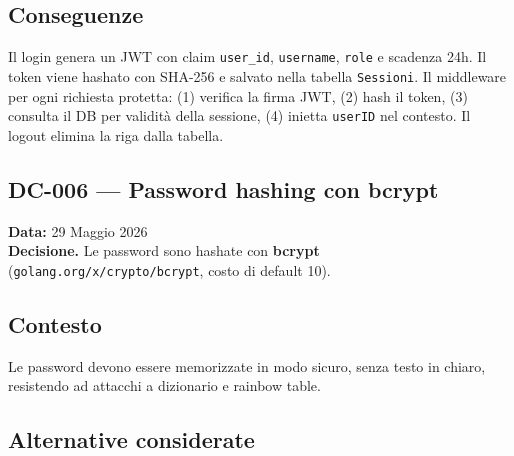 \documentclass[a4paper,12pt]{article}
\begin{document}
\subsection*{Conseguenze}
Il login genera un JWT con claim \texttt{user\_id}, \texttt{username}, \texttt{role} e scadenza 24h. Il token viene hashato con SHA-256 e salvato nella tabella \texttt{Sessioni}. Il middleware per ogni richiesta protetta: (1) verifica la firma JWT, (2) hash il token, (3) consulta il DB per validit\`{a} della sessione, (4) inietta \texttt{userID} nel contesto. Il logout elimina la riga dalla tabella.

\begin{decisionbox}
\section*{DC-006 --- Password hashing con bcrypt}
\textbf{Data:} 29 Maggio 2026\\
\textbf{Decisione.} Le password sono hashate con \textbf{bcrypt} (\texttt{golang.org/x/crypto/bcrypt}, costo di default 10).
\end{decisionbox}

\subsection*{Contesto}
Le password devono essere memorizzate in modo sicuro, senza testo in chiaro, resistendo ad attacchi a dizionario e rainbow table.


\subsection*{Alternative considerate}
\end{document}
